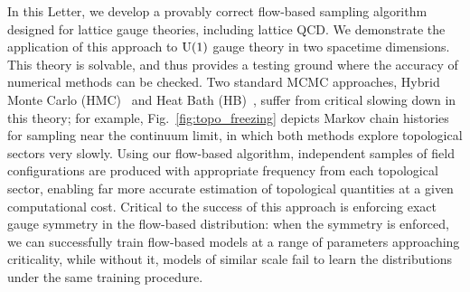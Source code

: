 In this Letter, we develop a provably correct flow-based sampling algorithm designed for lattice gauge theories, including lattice QCD. We demonstrate the application of this approach to $\mathrm{U}(1)$ gauge theory in two spacetime dimensions. This theory is solvable, and thus provides a testing ground where the accuracy of numerical methods can be checked. Two standard MCMC approaches, Hybrid Monte Carlo (HMC)~\cite{Duane1987HMC} and Heat Bath (HB)~\cite{Creutz:1979dw,Cabibbo:1982zn,Kennedy:1985nu}, suffer from critical slowing down in this theory; for example, Fig.~\ref{fig:topo_freezing} depicts Markov chain histories for sampling near the continuum limit, in which both methods explore topological sectors very slowly. Using our flow-based algorithm, independent samples of field configurations are produced with appropriate frequency from each topological sector, enabling far more accurate estimation of topological quantities at a given computational cost. Critical to the success of this approach is enforcing exact gauge symmetry in the flow-based distribution: when the symmetry is enforced, we can successfully train flow-based models at a range of parameters approaching criticality, while without it, models of similar scale fail to learn the distributions under the same training procedure.

